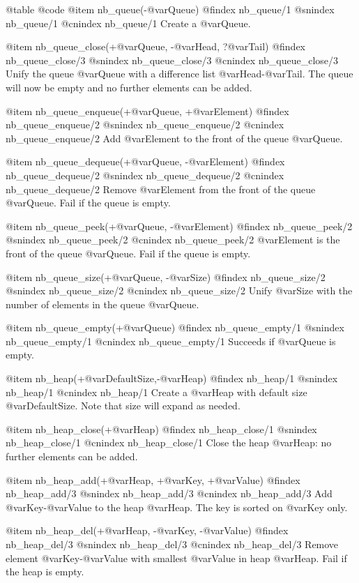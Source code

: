 @table @code
@item nb_queue(-@var{Queue})
@findex nb_queue/1
@snindex nb_queue/1
@cnindex nb_queue/1
Create a @var{Queue}.

@item nb_queue_close(+@var{Queue}, -@var{Head}, ?@var{Tail})
@findex nb_queue_close/3
@snindex nb_queue_close/3
@cnindex nb_queue_close/3
Unify the queue  @var{Queue} with a difference list
@var{Head}-@var{Tail}. The queue will now be empty and no further
elements can be added.

@item nb_queue_enqueue(+@var{Queue}, +@var{Element})
@findex nb_queue_enqueue/2
@snindex nb_queue_enqueue/2
@cnindex nb_queue_enqueue/2
Add @var{Element} to the front of the queue  @var{Queue}.

@item nb_queue_dequeue(+@var{Queue}, -@var{Element})
@findex nb_queue_dequeue/2
@snindex nb_queue_dequeue/2
@cnindex nb_queue_dequeue/2
Remove @var{Element} from the front of the queue  @var{Queue}. Fail if
the queue is empty.

@item nb_queue_peek(+@var{Queue}, -@var{Element})
@findex nb_queue_peek/2
@snindex nb_queue_peek/2
@cnindex nb_queue_peek/2
@var{Element} is the front of the queue  @var{Queue}. Fail if
the queue is empty.

@item nb_queue_size(+@var{Queue}, -@var{Size})
@findex nb_queue_size/2
@snindex nb_queue_size/2
@cnindex nb_queue_size/2
Unify @var{Size} with the number of elements in the queue  @var{Queue}.

@item nb_queue_empty(+@var{Queue})
@findex nb_queue_empty/1
@snindex nb_queue_empty/1
@cnindex nb_queue_empty/1
Succeeds if  @var{Queue} is empty.

@item nb_heap(+@var{DefaultSize},-@var{Heap})
@findex nb_heap/1
@snindex nb_heap/1
@cnindex nb_heap/1
Create a @var{Heap} with default size @var{DefaultSize}. Note that size
will expand as needed.

@item nb_heap_close(+@var{Heap})
@findex nb_heap_close/1
@snindex nb_heap_close/1
@cnindex nb_heap_close/1
Close the heap @var{Heap}: no further elements can be added.

@item nb_heap_add(+@var{Heap}, +@var{Key}, +@var{Value})
@findex nb_heap_add/3
@snindex nb_heap_add/3
@cnindex nb_heap_add/3
Add @var{Key}-@var{Value} to the heap @var{Heap}. The key is sorted on
@var{Key} only.

@item nb_heap_del(+@var{Heap}, -@var{Key}, -@var{Value})
@findex nb_heap_del/3
@snindex nb_heap_del/3
@cnindex nb_heap_del/3
Remove element @var{Key}-@var{Value} with smallest @var{Value} in heap
@var{Heap}. Fail if the heap is empty.

